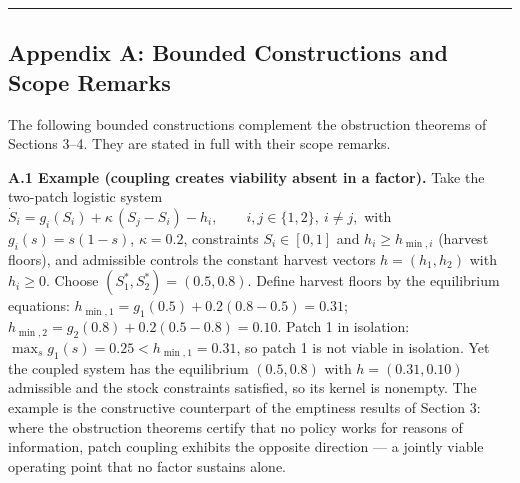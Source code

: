 \documentclass[11pt]{article}
\theoremstyle{definition}
\begin{document}
\begin{center}\rule{0.5\linewidth}{0.5pt}\end{center}

\subsection{Appendix A: Bounded Constructions and Scope
Remarks}\label{appendix-a-bounded-constructions-and-scope-remarks}

The following bounded constructions complement the obstruction theorems
of Sections 3--4. They are stated in full with their scope remarks.

\textbf{A.1 Example (coupling creates viability absent in a factor).}
Take the two-patch logistic system
\(\dot S_i = g_i(S_i) + \kappa\,(S_j - S_i) - h_i, \qquad i, j \in \{1,2\},\ i \ne j,\)
with \(g_i(s) = s(1-s)\), \(\kappa = 0.2\), constraints \(S_i \in [0,1]\) and \(h_i \ge h_{\min,i}\) (harvest floors), and admissible controls the constant harvest vectors \(h = (h_1, h_2)\) with \(h_i \ge 0\). Choose
\((S_1^*, S_2^*) = (0.5, 0.8)\). Define harvest floors by the equilibrium equations: \(h_{\min,1} = g_1(0.5) + 0.2(0.8 - 0.5) = 0.31\); \(h_{\min,2} = g_2(0.8) + 0.2(0.5 - 0.8) = 0.10\). Patch 1 in isolation:
\(\max_s g_1(s) = 0.25 < h_{\min,1} = 0.31\), so patch 1 is not viable
in isolation. Yet the coupled system has the equilibrium \((0.5, 0.8)\)
with \(h = (0.31, 0.10)\) admissible and the stock constraints
satisfied, so its kernel is nonempty. The example is the constructive
counterpart of the emptiness results of Section 3: where the obstruction
theorems certify that no policy works for reasons of information, patch
coupling exhibits the opposite direction --- a jointly viable operating
point that no factor sustains alone.
\end{document}
